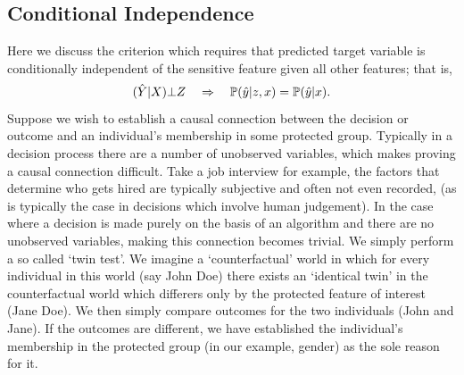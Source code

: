 \subsection{Conditional Independence} \label{sec_CondIndep}

Here we discuss the criterion which requires that predicted target variable is conditionally independent of the sensitive feature given all other features; that is,
\[
(\hat{Y} | X) \bot Z \quad \Rightarrow \quad
\mathbb{P}(\hat{y} | z, x) = \mathbb{P}(\hat{y} | x).
\]
Suppose we wish to establish a causal connection between the decision or outcome and an individual's membership in some protected group. Typically in a decision process there are a number of unobserved variables, which makes proving a causal connection difficult. Take a job interview for example, the factors that determine who gets hired are typically subjective and often not even recorded, (as is typically the case in decisions which involve human judgement). In the case where a decision is made purely on the basis of an algorithm and there are no unobserved variables, making this connection becomes trivial. We simply perform a so called `twin test'. We imagine a `counterfactual' world in which for every individual in this world (say John Doe) there exists an `identical twin' in the counterfactual world which differers only by the protected feature of interest (Jane Doe). We then simply compare outcomes for the two individuals (John and Jane). If the outcomes are different, we have established the individual's membership in the protected group (in our example, gender) as the sole reason for it.

